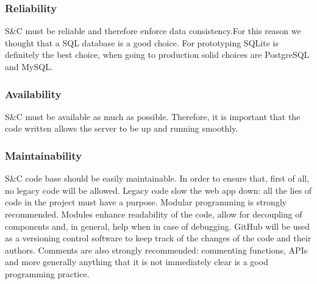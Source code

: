 \subsubsection{Reliability}
S\&C must be reliable and therefore enforce data consistency.For this reason we thought that a SQL database is a good choice. For prototyping SQLite is definitely the best choice, when going to production solid choices are PostgreSQL and MySQL.

\subsubsection{Availability}
S\&C must be available as much as possible. Therefore, it is important that the code written allows the server to be up and running smoothly.

\subsubsection{Maintainability}
S\&C code base should be easily maintainable. In order to ensure that, first of all, no legacy code will be allowed. Legacy code slow the web app down: all the lies of code in the project must have a purpose. Modular programming is strongly recommended. Modules enhance readability of the code, allow for decoupling of components and, in general, help when in case of debugging. GitHub will be used as a versioning control software to keep track of the changes of the code and their authors. Comments are also strongly recommended: commenting functions, APIs and more generally anything that it is not immediately clear is a good programming practice.